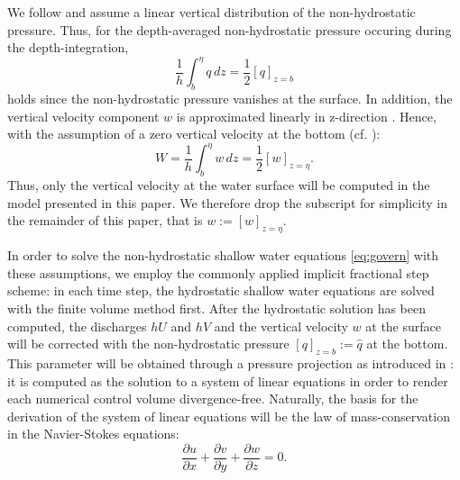 We follow \cite{walters} and assume a linear vertical distribution of the non-hydrostatic pressure. Thus, for the depth-averaged non-hydrostatic pressure occuring during the depth-integration,
\begin{equation}
\frac{1}{h} \int_{b}^{\eta} q \, dz= \frac{1}{2} [q]_{z=b}
\end{equation}
holds since the non-hydrostatic pressure vanishes at the surface. In addition, the vertical velocity component $w$ is approximated linearly in z-direction \cite{walters}. Hence, with the assumption of a zero vertical velocity at the bottom (cf. \cite{cui}):
\begin{equation}
W=  \frac{1}{h} \int_{b}^{\eta} w \, dz= \frac{1}{2} [w]_{z=\eta}.
\end{equation}
Thus, only the vertical velocity at the water surface will be computed in the model presented in this paper. We therefore drop the subscript for simplicity in the remainder of this paper, that is $w:=[w]_{z=\eta}$.

In order to solve the non-hydrostatic shallow water equations \eqref{eq:govern} with these assumptions, we employ the commonly applied implicit fractional step scheme: in each time step, the hydrostatic shallow water equations are solved with the finite volume method first. After the hydrostatic solution has been computed, the discharges $hU$ and $hV$ and the vertical velocity $w$ at the surface will be corrected with the non-hydrostatic pressure $[q]_{z=b}:=\hat q$ at the bottom. This parameter will be obtained through a pressure projection as introduced in \cite{chorin}: it is computed as the solution to a system of linear equations in order to render each numerical control volume divergence-free. Naturally, the basis for the derivation of the system of linear equations will be the law of mass-conservation in the Navier-Stokes equations:
\begin{equation}
\frac{\partial u}{\partial x}
+
\frac{\partial v}{\partial y}
+
\frac{\partial w}{\partial z}
=
0.
\label{eq:mass_consv}
\end{equation}

